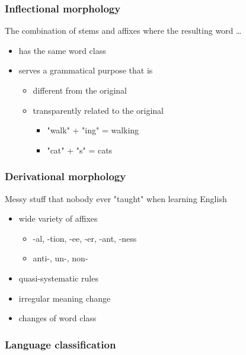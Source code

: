 \documentclass[11pt]{article}
\begin{document}
\subsubsection*{Inflectional morphology}

The combination of stems and affixes where the resulting word \ldots

\begin{itemize}
	\item has the same word class
	\item serves a grammatical purpose that is
	      \begin{itemize}
		      \item different from the original
		      \item transparently related to the original
		            \begin{itemize}
			            \item "walk" + "ing" = walking
			            \item "cat" + "s" = cats
		            \end{itemize}
	      \end{itemize}
\end{itemize}

\subsubsection*{Derivational morphology}

Messy stuff that nobody ever "taught" when learning English

\begin{itemize}
	\item wide variety of affixes
	      \begin{itemize}
		      \item -al, -tion, -ee, -er, -ant, -ness
		      \item anti-, un-, non-
	      \end{itemize}

	\item quasi-systematic rules

	\item irregular meaning change

	\item changes of word class
\end{itemize}

\subsubsection{Language classification}
\end{document}
